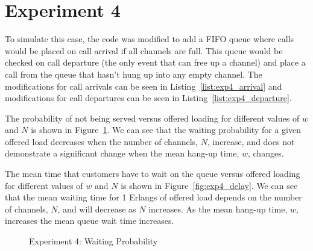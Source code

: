 \section*{Experiment 4}
To simulate this case, the code was modified to add a FIFO queue where calls would be placed on call arrival if all channels are full. This queue would be checked on call departure (the only event that can free up a channel) and place a call from the queue that hasn't hung up into any empty channel. The modifications for call arrivals can be seen in Listing~\ref{list:exp4_arrival} and modifications for call departures can be seen in Listing~\ref{list:exp4_departure}.

The probability of not being served versus offered loading for different values of $w$ and $N$ is shown in Figure~\ref{fig:exp4_prob}. We can see that the waiting probability for a given offered load decreases when the number of channels, $N$, increase, and does not demonstrate a significant change when the mean hang-up time, $w$, changes.

The mean time that customers have to wait on the queue versus offered loading for different values of $w$ and $N$ is shown in Figure~\ref{fig:exp4_delay}. We can see that the mean waiting time for 1 Erlangs of offered load depends on the number of channels, $N$, and will decrease as $N$ increases. As the mean hang-up time, $w$, increases the mean queue wait time increases.

\begin{figure}[htp]
\centering
\captionsetup{justification=centering}
\caption{Experiment 4: Waiting Probability}
\label{fig:exp4_prob}
\end{figure}

